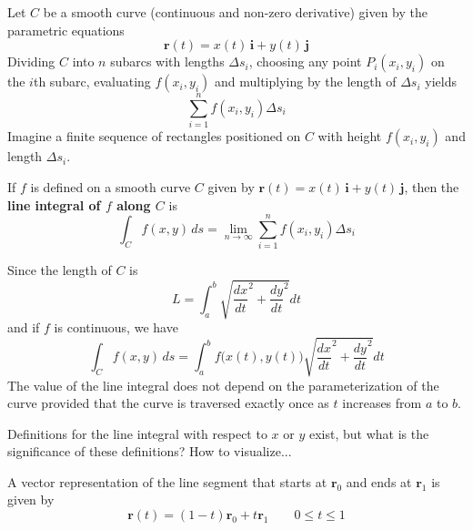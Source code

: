 \documentclass[../main.tex]{subfiles}
\begin{document}
Let $C$ be a smooth curve (continuous and non-zero derivative) given by the parametric equations
\begin{equation*}
\textbf{r}(t) = x(t)\,\textbf{i} + y(t)\,\textbf{j}
\end{equation*}
Dividing $C$ into $n$ subarcs with lengths $\Delta s_i$, choosing any point $P_i(x_i,y_i)$ on the $i$th subarc, evaluating $f(x_i,y_i)$ and multiplying by the length of $\Delta s_i$ yields
\begin{equation*}
\sum_{i=1}^n{f(x_i,y_i)\Delta s_i}
\end{equation*}
Imagine a finite sequence of rectangles positioned on $C$ with height $f(x_i,y_i)$ and length $\Delta s_i$.

\begin{definition}\label{def:LineIntegral}
If $f$ is defined on a smooth curve $C$ given by $\textbf{r}(t) = x(t)\,\textbf{i} + y(t)\,\textbf{j}$, then the \textbf{line integral of $f$ along $C$} is
\begin{equation*}
	\int_C{f(x,y)\,ds = \lim_{n\rightarrow\infty}{\sum_{i=1}^n{f(x_i,y_i)\Delta s_i}}}
\end{equation*}
\end{definition}

Since the length of $C$ is
\begin{equation*}
	L = \int_a^b{\sqrt{\frac{dx}{dt}^2+\frac{dy}{dt}^2} dt}
\end{equation*}
and if $f$ is continuous, we have
\begin{equation*}
\int_C{f(x,y)\,ds} = \int_a^b{f\big(x(t),y(t)\big)\sqrt{\frac{dx}{dt}^2+\frac{dy}{dt}^2} dt}
\end{equation*}
The value of the line integral does not depend on the parameterization of the curve provided that the curve is traversed exactly once as $t$ increases from $a$ to $b$.

\color{red} Definitions for the line integral with respect to $x$ or $y$ exist, but what is the significance of these definitions? How to visualize...
\color{black}

A vector representation of the line segment that starts at $\textbf{r}_0$ and ends at $\textbf{r}_1$ is given by
\begin{equation*}
\textbf{r}(t) = (1-t)\textbf{r}_0+t\textbf{r}_1\qquad 0\le t\le 1
\end{equation*}
\end{document}
